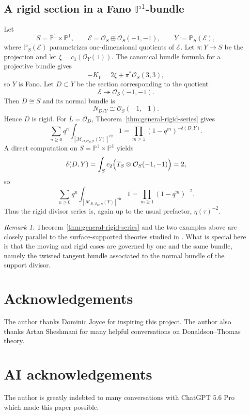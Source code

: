 \documentclass[12pt]{amsart}
\numberwithin{equation}{section}
\newcommand{\PP}{\mathbb{P}}
\newcommand{\OO}{\mathcal{O}}
\newcommand{\M}{\mathcal{M}}
\newcommand{\vfc}[1]{[#1]^{\mathrm{vir}}}
\theoremstyle{plain}
\theoremstyle{definition}
\theoremstyle{remark}
\newtheorem{remark}[theorem]{Remark}
\begin{document}
\subsection{A rigid section in a Fano $\PP^1$-bundle}
Let
\[
S=\PP^1\times \PP^1,
\qquad
\mathcal E=\OO_S\oplus \OO_S(-1,-1),
\qquad
Y:=\PP_S(\mathcal E),
\]
where $\PP_S(\mathcal E)$ parametrizes one-dimensional quotients of $\mathcal E$.
Let $\pi\colon Y\to S$ be the projection and let $\xi=c_1(\OO_Y(1))$.
The canonical bundle formula for a projective bundle gives
\[
-K_Y=2\xi+\pi^*\OO_S(3,3),
\]
so $Y$ is Fano.
Let $D\subset Y$ be the section corresponding to the quotient
\[
\mathcal E\twoheadrightarrow \OO_S(-1,-1).
\]
Then $D\cong S$ and its normal bundle is
\[
N_{D/Y}\cong \OO_S(-1,-1).
\]
Hence $D$ is rigid.
For $L=\OO_D$, Theorem~\ref{thm:general-rigid-series} gives
\[
\sum_{n\ge 0}q^n\int_{\vfc{\M_{D,\OO_D,n}(Y)}}1
=
\prod_{m\ge 1}(1-q^m)^{-\delta(D,Y)}.
\]
A direct computation on $S=\PP^1\times \PP^1$ yields
\[
\delta(D,Y)=\int_S c_2\Bigl(T_S\otimes \OO_S(-1,-1)\Bigr)=2,
\]
so
\begin{equation}\label{eq:p1p1-series}
\sum_{n\ge 0}q^n\int_{\vfc{\M_{D,\OO_D,n}(Y)}}1
=
\prod_{m\ge 1}(1-q^m)^{-2}.
\end{equation}
Thus the rigid divisor series is, again up to the usual prefactor, $\eta(\tau)^{-2}$.

\begin{remark}\label{rem:gs}
Theorem~\ref{thm:general-rigid-series} and the two examples above are closely parallel to the surface-supported theories studied in \cite{GSmod,GSlinear}.
What is special here is that the moving and rigid cases are governed by one and the same bundle, namely the twisted tangent bundle associated to the normal bundle of the support divisor.
\end{remark}

\section*{Acknowledgements}
The author thanks Dominic Joyce for inspiring this project. The author also thanks Artan Sheshmani for many helpful conversations on Donaldson--Thomas theory. 

\section*{AI acknowledgements}
The author is greatly indebted to many conversations with ChatGPT 5.6 Pro which made this paper possible.
\end{document}
